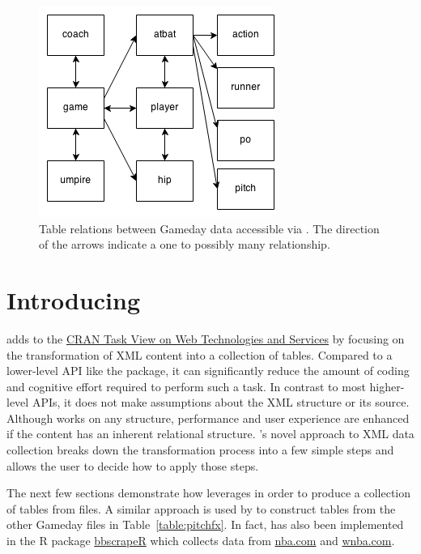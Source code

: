 \documentclass[a4paper]{report}\usepackage[]{graphicx}\usepackage[]{color}
\begin{document}
\begin{article}
\begin{figure}
\centerline{\includegraphics[scale = 0.75]{Drawing1.png}}

\caption{Table relations between Gameday data accessible via .
The direction of the arrows indicate a one to possibly many relationship.
\label{fig:relations}}


\end{figure}



\section{Introducing }

 adds to the \href{http://cran.r-project.org/web/views/WebTechnologies.html}{CRAN Task View on Web Technologies and Services}
by focusing on the transformation of XML content into a collection
of tables. Compared to a lower-level API like the  package,
it can significantly reduce the amount of coding and cognitive effort
required to perform such a task. In contrast to most higher-level
APIs, it does not make assumptions about the XML structure or its
source. Although  works on any structure, performance
and user experience are enhanced if the content has an inherent relational
structure. 's novel approach to XML data collection breaks
down the transformation process into a few simple steps and allows
the user to decide how to apply those steps.

The next few sections demonstrate how  leverages 
in order to produce a collection of tables from 
files. A similar approach is used by  to construct
tables from the other Gameday files in Table~\ref{table:pitchfx}.
In fact,  has also been implemented in the R package \href{https://github.com/cpsievert/bbscrapeR}{bbscrapeR}
which collects data from \href{http://nba.com}{nba.com} and \href{http://wnba.com}{wnba.com}.



\end{article}
\end{document}
